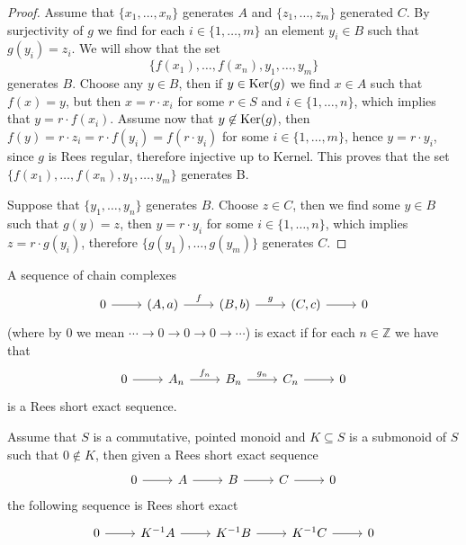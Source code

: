 \begin{proof}
    Assume that $\{x_1,\dots,x_n\}$ generates $A$ and $\{z_1,\dots,z_m\}$ generated $C$. By surjectivity of $g$ we find 
    for each $i\in\{1,\dots,m\}$ an element $y_i\in B$ such that $g(y_i)=z_i$. We will show that the set 
    \[
        \{f(x_1),\dots,f(x_n),y_1,\dots,y_m\}
    \]
    generates $B$. Choose any $y\in B$, then if $y\in\mathrm{Ker}(g)$ we find $x\in A$ such that $f(x)=y$, but then 
    $x=r\cdot x_i$ for some $r\in S$ and $i\in\{1,\dots,n\}$, which implies that $y=r\cdot f(x_i)$. Assume now that $y\not\in\mathrm{Ker}(g)$,
    then $f(y) = r\cdot z_i = r\cdot f(y_i) = f(r\cdot y_i)$ for some $i\in\{1,\dots,m\}$, hence $y=r\cdot y_i$, since $g$ is Rees regular, therefore 
    injective up to Kernel. This proves that the set $\{f(x_1),\dots,f(x_n),y_1,\dots,y_m\}$ generates B. \par 
    Suppose that $\{y_1,\dots,y_n\}$ generates $B$. Choose $z\in C$, then we find some $y\in B$ such that $g(y)=z$, then 
    $y=r\cdot y_i$ for some $i\in\{1,\dots,n\}$, which implies $z=r\cdot g(y_i)$, therefore $\{g(y_1),\dots,g(y_m)\}$ generates $C$.
\end{proof}
\begin{definition}
    A sequence of chain complexes 
\[\begin{tikzcd}
	0 & {(A,a)} & {(B,b)} & {(C,c)} & 0
	\arrow[from=1-1, to=1-2]
	\arrow["f", from=1-2, to=1-3]
	\arrow["g", from=1-3, to=1-4]
	\arrow[from=1-4, to=1-5]
\end{tikzcd}\]
    (where by $0$ we mean $\cdots\to 0\to0\to0\to\cdots$) is exact 
    if for each $n\in\mathbb{Z}$ we have that 
    \[\begin{tikzcd}
	0 & {A_n} & {B_n} & {C_n} & 0
        \arrow[from=1-1, to=1-2]
        \arrow["{f_n}", from=1-2, to=1-3]
        \arrow["{g_n}", from=1-3, to=1-4]
        \arrow[from=1-4, to=1-5]
    \end{tikzcd}\]
    is a Rees short exact sequence.
\end{definition}
\begin{proposition}
    Assume that $S$ is a commutative, pointed monoid and $K\subseteq S$ is a submonoid of $S$ such that $0\not\in K$, then
    given a Rees short exact sequence 
    \[\begin{tikzcd}
        0 & A & B & C & 0
        \arrow[from=1-1, to=1-2]
        \arrow[from=1-2, to=1-3]
        \arrow[from=1-3, to=1-4]
        \arrow[from=1-4, to=1-5]
    \end{tikzcd}\]
    the following sequence is Rees short exact
    \[\begin{tikzcd}
        0 & {K^{-1}A} & {K^{-1}B} & {K^{-1}C} & 0
        \arrow[from=1-1, to=1-2]
        \arrow[from=1-2, to=1-3]
        \arrow[from=1-3, to=1-4]
        \arrow[from=1-4, to=1-5]
    \end{tikzcd}\]
\end{proposition}
